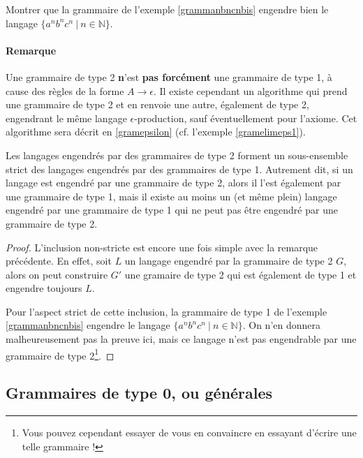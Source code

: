 \begin{exercice}
Montrer que la grammaire de l'exemple \ref{grammanbncnbis} engendre bien le langage \newline $\{a^nb^nc^n ~|~ n \in \mathbb{N}\}$.
\end{exercice}

\paragraph{Remarque} Une grammaire de type 2 \textbf{n}'est \textbf{pas forcément} une grammaire de type 1, à cause des règles de la forme $A \rightarrow \epsilon$. Il existe cependant un algorithme qui prend une grammaire de type 2 et en renvoie une autre, également de type 2, engendrant le même langage $\epsilon$-production, sauf éventuellement pour l'axiome. Cet algorithme sera décrit en \ref{gramepsilon} (cf. l'exemple \ref{gramelimeps1}). 

\begin{lemma}
Les langages engendrés par des grammaires de type 2 forment un sous-ensemble strict des langages engendrés par des grammaires de type 1. Autrement dit, si un langage est engendré par une grammaire de type 2, alors il l'est également par une grammaire de type 1, mais il existe au moins un (et même plein) langage engendré par une grammaire de type 1 qui ne peut pas être engendré par une grammaire de type 2.  
\end{lemma}

\begin{proof}
L'inclusion non-stricte est encore une fois simple avec la remarque précédente. En effet, soit $L$ un langage engendré par la grammaire de type 2 $G$, alors on peut construire $G'$ une gramaire de type 2 qui est également de type 1 et engendre toujours $L$.

Pour l'aspect strict de cette inclusion, la grammaire de type 1 de l'exemple \ref{grammanbncnbis} engendre le langage $\{a^nb^nc^n ~|~ n \in \mathbb{N}\}$. On n'en donnera malheureusement pas la preuve ici, mais ce langage n'est pas engendrable par une grammaire de type 2\footnote{Vous pouvez cependant essayer de vous en convaincre en essayant d'écrire une telle grammaire !}.
\end{proof}






\subsection{Grammaires de type 0, ou générales}

